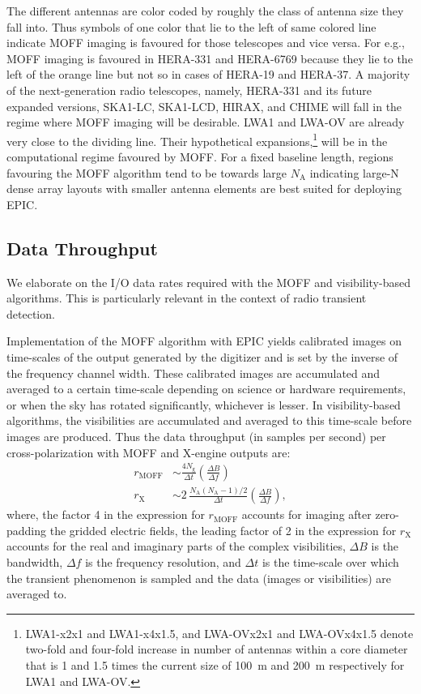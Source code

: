 \documentclass[a4paper,fleqn,usenatbib]{mnras}
\newcommand{\Nant}{N_\textrm{A}}
\newcommand{\Ngrid}{N_\textrm{g}}
\begin{document}
The different antennas are color coded by roughly the class of antenna size they fall into. Thus symbols of one color that lie to the left of same colored line indicate MOFF imaging is favoured for those telescopes and vice versa. For e.g., MOFF imaging is favoured in HERA-331 and HERA-6769 because they lie to the left of the orange line but not so in cases of HERA-19 and HERA-37. A majority of the next-generation radio telescopes, namely, HERA-331 and its future expanded versions, SKA1-LC, SKA1-LCD, HIRAX, and CHIME will fall in the regime where MOFF imaging will be desirable. LWA1 and LWA-OV are already very close to the dividing line. Their hypothetical expansions,\footnote{LWA1-x2x1 and LWA1-x4x1.5, and LWA-OVx2x1 and LWA-OVx4x1.5 denote two-fold and four-fold increase in number of antennas within a core diameter that is 1 and 1.5 times the current size of 100~m and 200~m respectively for LWA1 and LWA-OV.} will be in the computational regime favoured by MOFF. For a fixed baseline length, regions favouring the MOFF algorithm tend to be towards large $\Nant$ indicating large-N dense array layouts with smaller antenna elements are best suited for deploying EPIC.

\subsection{Data Throughput}

We elaborate on the I/O data rates required with the MOFF and visibility-based
algorithms. This is particularly relevant in the context of radio transient 
detection. 

Implementation of the MOFF algorithm with EPIC yields calibrated images on
time-scales of the output generated by the digitizer and is set by the inverse
of the frequency channel width. These calibrated images are accumulated and 
averaged to a certain time-scale depending on science or hardware requirements,
or when the sky has rotated significantly, whichever is lesser. In 
visibility-based algorithms, the visibilities are accumulated and averaged to 
this time-scale before images are produced. Thus the data throughput (in samples 
per second) per cross-polarization with MOFF and X-engine outputs are: 
\begin{align}
  r_\textrm{MOFF} &\sim \frac{4\Ngrid}{\Delta t} \left(\frac{\Delta B}{\Delta f}\right) \\
  r_\textrm{X} &\sim 2\,\frac{\Nant(\Nant-1)/2}{\Delta t} \left(\frac{\Delta B}{\Delta f}\right),
\end{align}
where, the factor 4 in the expression for $r_\textrm{MOFF}$ accounts for imaging
after zero-padding the gridded electric fields, the leading factor of 2 in the
expression for $r_\textrm{X}$ accounts for the real and imaginary parts of the
complex visibilities, $\Delta B$ is the bandwidth, $\Delta f$ is the frequency 
resolution, and $\Delta t$ is the time-scale over which the transient phenomenon
is sampled and the data (images or visibilities) are averaged to.
\end{document}
